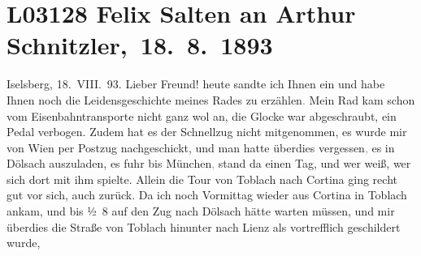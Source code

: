 

\section[ Felix Salten an Arthur Schnitzler, 18. 8. 1893]{L03128 Felix Salten an Arthur Schnitzler, 18. 8. 1893}
\nopagebreak{}
\rehead{ }\normalsize\beginnumbering{}
\toendnotes[C]{\smallbreak\pagebreak[2]}
\toendnotes[C]{\smallbreak}
\pstart
           \raggedleft{}{\pb}Iselsberg, 18. VIII. 93.\pend
           \vspace{0.5em}
\pstart
           Lieber Freund!{ }heute sandte ich Ihnen ein \label{K_L03128-1v}\label{K_L03128-1} und habe Ihnen noch die Leidensgeschichte meines Rades zu
                  erzählen\textcolor{gray}{.} Mein Rad kam schon vom Eisenbahntransporte nicht ganz
               wol an, die Glocke war abgeschraubt, ein Pedal verbogen. Zudem hat es der Schnellzug
               nicht mitgenommen, es wurde mir von Wien per
               Postzug nachgeschickt, und man hatte überdies vergessen\textcolor{gray}{,} es in Dölsach auszuladen, es fuhr bis München\textcolor{gray}{,} stand da einen Tag, und wer weiß, wer sich dort mit ihm spielte.
               Allein die Tour von Toblach nach Cortina ging recht gut vor sich, auch zurück. Da ich noch
                  Vormittag wieder aus Cortina in
                  Toblach ankam, und bis ½ 8 auf
               den Zug nach Dölsach hätte warten müssen, und mir
               überdies die Straße von Toblach hinunter nach Lienz als vortrefflich geschildert wurde,
